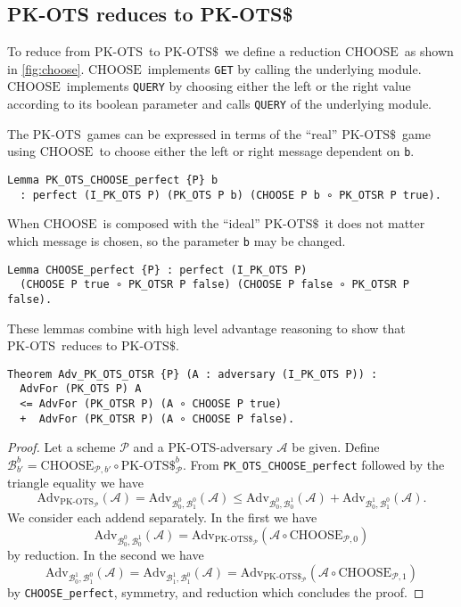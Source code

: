 \documentclass[a4paper,USenglish,cleveref, autoref]{lipics-v2021}
\newcommand{\M}[1]{\texttt{#1}}
\newcommand{\Adv}{\mathrm{Adv}}
\newcommand{\A}{\mathcal{A}}
\renewcommand{\P}{\mathcal{P}}
\newcommand{\OTS}{\ensuremath{\mathrm{PK\text{-}OTS}}}
\newcommand{\OTSR}{\ensuremath{\mathrm{PK\text{-}OTS\$}}}
\newcommand{\CHOOSE}{\ensuremath{\mathrm{CHOOSE}}}
\begin{document}
\subsection{PK-OTS reduces to PK-OTS\$} \label{sec:otsotsr}

To reduce from \OTS\ to \OTSR\ we define a reduction \CHOOSE\ as shown in \cref{fig:choose}.
\CHOOSE\ implements \M{GET} by calling the underlying module.
\CHOOSE\ implements \M{QUERY} by choosing either the left or the right value according to its boolean parameter and calls \M{QUERY} of the underlying module.

The \OTS\ games can be expressed in terms of the ``real'' \OTSR\ game
using \CHOOSE\ to choose either the left or right message dependent
on \M{b}.

\begin{verbatim}
Lemma PK_OTS_CHOOSE_perfect {P} b
  : perfect (I_PK_OTS P) (PK_OTS P b) (CHOOSE P b ∘ PK_OTSR P true).
\end{verbatim}

When \CHOOSE\ is composed with the ``ideal'' \OTSR\ it does not
matter which message is chosen, so the parameter \M{b} may be changed.

\begin{verbatim}
Lemma CHOOSE_perfect {P} : perfect (I_PK_OTS P)
  (CHOOSE P true ∘ PK_OTSR P false) (CHOOSE P false ∘ PK_OTSR P false).
\end{verbatim}

These lemmas combine with high level advantage reasoning to show
that \OTS\ reduces to \OTSR.

\begin{verbatim}
Theorem Adv_PK_OTS_OTSR {P} (A : adversary (I_PK_OTS P)) :
  AdvFor (PK_OTS P) A
  <= AdvFor (PK_OTSR P) (A ∘ CHOOSE P true)
  +  AdvFor (PK_OTSR P) (A ∘ CHOOSE P false).
\end{verbatim}
\begin{proof}
  Let a scheme $\P$ and a \OTS-adversary $\A$ be given.
  Define $\mathcal{B}_{b'}^b = \CHOOSE_{\P,b'} \circ \OTSR^b_\P$.
  From \M{PK_OTS_CHOOSE_perfect} followed by the triangle equality we have
  $$\Adv_{\OTS_\P}(\A)
    = \Adv_{\mathcal{B}_0^0, \mathcal{B}_1^0}(\A) \leq \Adv_{\mathcal{B}_0^0, \mathcal{B}_0^1}(\A) + \Adv_{\mathcal{B}_0^1, \mathcal{B}_1^0}(\A).$$
  We consider each addend separately. In the first we have
  $$\Adv_{\mathcal{B}_0^0,\mathcal{B}_0^1}(\A) = \Adv_{\OTSR_\P}(\A \circ \CHOOSE_{\P,0})$$
  by reduction.
  In the second we have
  $$\Adv_{\mathcal{B}_0^1,\mathcal{B}_1^0}(\A) = \Adv_{\mathcal{B}_1^1,\mathcal{B}_1^0}(\A) = \Adv_{\OTSR_\P}(\A \circ \CHOOSE_{\P,1})$$
  by \M{CHOOSE_perfect}, symmetry, and reduction which concludes the proof.
\end{proof}
\end{document}
